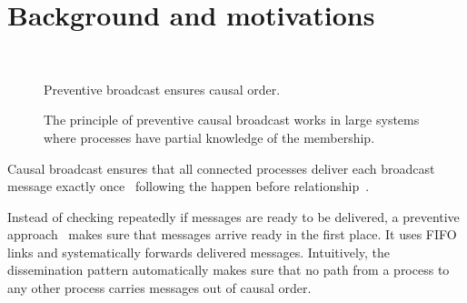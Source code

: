 
\section{Background and motivations}
\label{sec:motivations}

\begin{figure*}
  \begin{center}
    \hspace{40pt}
    \hspace{40pt}
    \\
    \hspace{40pt}
    \caption{\label{fig:generalsolve}Preventive broadcast ensures causal order.}
  \end{center}
\end{figure*}


\begin{figure*}
  \begin{center}
    
    \caption{\label{fig:disseminationtree}The principle of preventive causal
      broadcast works in large systems where processes have partial knowledge
      of the membership.}
  \end{center}
\end{figure*}

Causal broadcast ensures that all connected processes deliver each broadcast
message exactly once~\cite{hadzilacos1994modular} following the happen before
relationship~\cite{lamport1978time}.

Instead of checking repeatedly if messages are ready to be delivered, a
preventive approach~\cite{friedman2004causal} makes sure that messages arrive
ready in the first place.  It uses FIFO links and systematically forwards
delivered messages.  Intuitively, the dissemination pattern automatically makes
sure that no path from a process to any other process carries messages out of
causal order.

